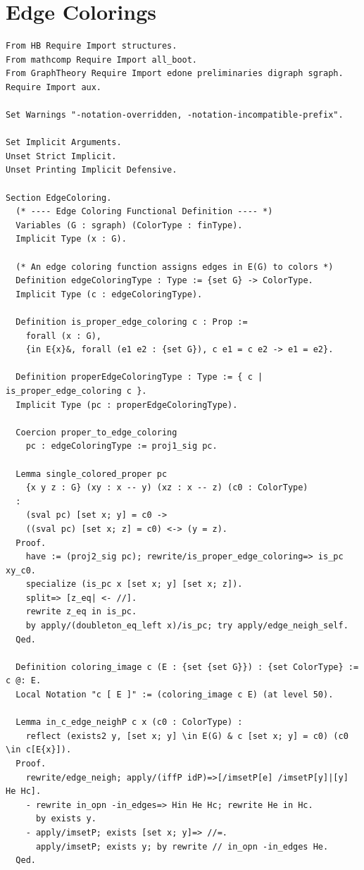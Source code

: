 \section{Edge Colorings}\label{apdx:ec}
\begin{verbatim}
From HB Require Import structures.
From mathcomp Require Import all_boot.
From GraphTheory Require Import edone preliminaries digraph sgraph.
Require Import aux.

Set Warnings "-notation-overridden, -notation-incompatible-prefix".

Set Implicit Arguments.
Unset Strict Implicit.
Unset Printing Implicit Defensive.

Section EdgeColoring.
  (* ---- Edge Coloring Functional Definition ---- *)
  Variables (G : sgraph) (ColorType : finType).
  Implicit Type (x : G).

  (* An edge coloring function assigns edges in E(G) to colors *)
  Definition edgeColoringType : Type := {set G} -> ColorType.
  Implicit Type (c : edgeColoringType).
  
  Definition is_proper_edge_coloring c : Prop := 
    forall (x : G),
    {in E{x}&, forall (e1 e2 : {set G}), c e1 = c e2 -> e1 = e2}.

  Definition properEdgeColoringType : Type := { c | is_proper_edge_coloring c }.
  Implicit Type (pc : properEdgeColoringType).

  Coercion proper_to_edge_coloring
    pc : edgeColoringType := proj1_sig pc.

  Lemma single_colored_proper pc 
    {x y z : G} (xy : x -- y) (xz : x -- z) (c0 : ColorType) 
  : 
    (sval pc) [set x; y] = c0 -> 
    ((sval pc) [set x; z] = c0) <-> (y = z).
  Proof.
    have := (proj2_sig pc); rewrite/is_proper_edge_coloring=> is_pc xy_c0.
    specialize (is_pc x [set x; y] [set x; z]).
    split=> [z_eq| <- //].
    rewrite z_eq in is_pc.
    by apply/(doubleton_eq_left x)/is_pc; try apply/edge_neigh_self.
  Qed.

  Definition coloring_image c (E : {set {set G}}) : {set ColorType} := c @: E.
  Local Notation "c [ E ]" := (coloring_image c E) (at level 50).

  Lemma in_c_edge_neighP c x (c0 : ColorType) : 
    reflect (exists2 y, [set x; y] \in E(G) & c [set x; y] = c0) (c0 \in c[E{x}]).
  Proof.
    rewrite/edge_neigh; apply/(iffP idP)=>[/imsetP[e] /imsetP[y]|[y] He Hc].
    - rewrite in_opn -in_edges=> Hin He Hc; rewrite He in Hc.
      by exists y.
    - apply/imsetP; exists [set x; y]=> //=.
      apply/imsetP; exists y; by rewrite // in_opn -in_edges He.
  Qed.
  

\end{verbatim}
